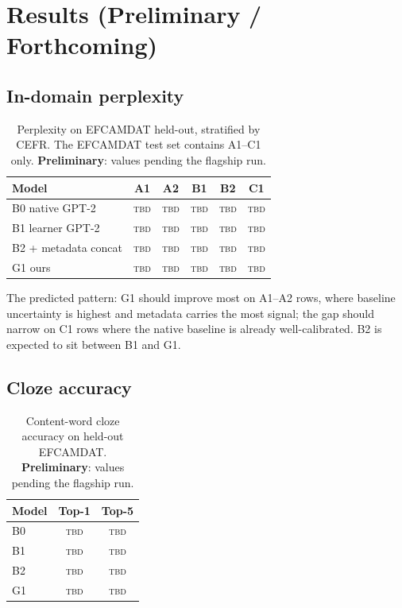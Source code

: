 \section{Results (Preliminary / Forthcoming)}
\label{sec:results}


\subsection{In-domain perplexity}
\label{subsec:indomain-ppl}

\begin{table}[t]
\centering
\small
\begin{tabular}{lccccc}
\toprule
Model          & A1 & A2 & B1 & B2 & C1 \\
\midrule
B0 native GPT-2 & \textsc{tbd} & \textsc{tbd} & \textsc{tbd} & \textsc{tbd} & \textsc{tbd} \\
B1 learner GPT-2 & \textsc{tbd} & \textsc{tbd} & \textsc{tbd} & \textsc{tbd} & \textsc{tbd} \\
B2 + metadata concat & \textsc{tbd} & \textsc{tbd} & \textsc{tbd} & \textsc{tbd} & \textsc{tbd} \\
G1 ours         & \textsc{tbd} & \textsc{tbd} & \textsc{tbd} & \textsc{tbd} & \textsc{tbd} \\
\bottomrule
\end{tabular}
\caption{Perplexity on EFCAMDAT held-out, stratified by CEFR. The EFCAMDAT
test set contains A1--C1 only.
\textbf{Preliminary}: values pending the flagship run.}
\label{tab:ppl-cefr}
\end{table}

The predicted pattern: G1 should improve most on A1--A2 rows, where
baseline uncertainty is highest and metadata carries the most signal;
the gap should narrow on C1 rows where the native baseline is already
well-calibrated. B2 is expected to sit between B1 and G1.

\subsection{Cloze accuracy}
\label{subsec:cloze-results}

\begin{table}[t]
\centering
\small
\begin{tabular}{lcc}
\toprule
Model & Top-1 & Top-5 \\
\midrule
B0 & \textsc{tbd} & \textsc{tbd} \\
B1 & \textsc{tbd} & \textsc{tbd} \\
B2 & \textsc{tbd} & \textsc{tbd} \\
G1 & \textsc{tbd} & \textsc{tbd} \\
\bottomrule
\end{tabular}
\caption{Content-word cloze accuracy on held-out EFCAMDAT.
\textbf{Preliminary}: values pending the flagship run.}
\label{tab:cloze}
\end{table}

